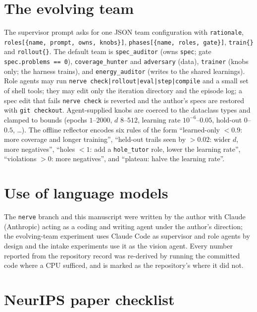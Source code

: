 \section{The evolving team}
\label{app:eat}

The supervisor prompt asks for one JSON team configuration with \texttt{rationale}, \texttt{roles[\{name, prompt, owns, knobs\}]}, \texttt{phases[\{name, roles, gate\}]}, \texttt{train\{\}} and \texttt{rollout\{\}}. The default team is \texttt{spec\_auditor} (owns \texttt{spec}; gate \texttt{spec.problems == 0}), \texttt{coverage\_hunter} and \texttt{adversary} (data), \texttt{trainer} (knobs only; the harness trains), and \texttt{energy\_auditor} (writes to the shared learnings). Role agents may run \texttt{nerve check|rollout|eval|step|compile} and a small set of shell tools; they may edit only the iteration directory and the episode log; a spec edit that fails \texttt{nerve check} is reverted and the author's specs are restored with \texttt{git checkout}. Agent-supplied knobs are coerced to the dataclass types and clamped to bounds (epochs $1$--$2000$, $d$ $8$--$512$, learning rate $10^{-6}$--$0.05$, hold-out $0$--$0.5$, \ldots). The offline reflector encodes six rules of the form ``learned-only $<0.9$: more coverage and longer training'', ``held-out trails seen by $>0.02$: wider $d$, more negatives'', ``holes $<1$: add a \texttt{hole\_tutor} role, lower the learning rate'', ``violations $>0$: more negatives'', and ``plateau: halve the learning rate''.

\section{Use of language models}
\label{app:llm}
The \texttt{nerve} branch and this manuscript were written by the author with Claude (Anthropic) acting as a coding and writing agent under the author's direction; the evolving-team experiment uses Claude Code as supervisor and role agents by design and the intake experiments use it as the vision agent. Every number reported from the repository record was re-derived by running the committed code where a CPU sufficed, and is marked as the repository's where it did not.


\section{NeurIPS paper checklist}
\label{app:checklist}

